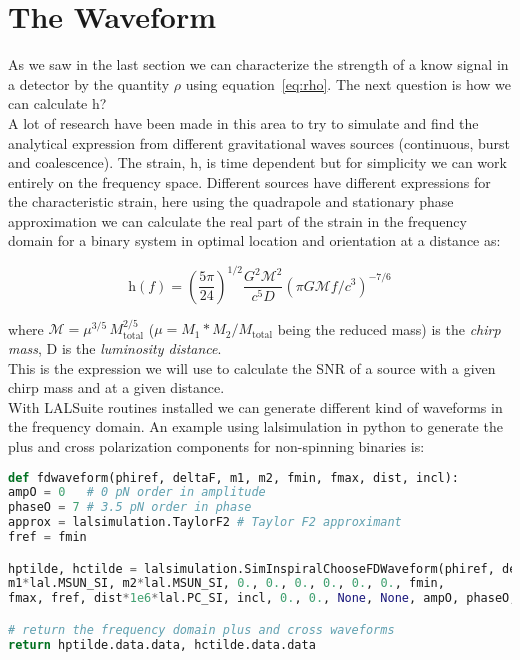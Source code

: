 \documentclass[11pt,fleqn]{book} %
\begin{document}
\section{The Waveform}\label{sec:waveform}


As we saw in the last section we can characterize the strength of a know signal in a detector by the quantity $\rho$ using equation~\ref{eq:rho}. The next question is how we can calculate h?\\

A lot of research have been made in this area to try to simulate and find the analytical expression from different gravitational waves sources (continuous, burst and coalescence). The strain, h, is time dependent but for simplicity we can work entirely on the frequency space. Different sources have different expressions for the characteristic strain, here using the quadrapole and stationary phase approximation we can calculate the real part of the strain in the frequency domain for a binary system in optimal location and orientation at a distance as:

\begin{equation}\label{eq:strain}
	\text{\~h}(f) = \left ( \frac{5 \pi}{24} \right )^{1/2}  \frac{G^2 \mathcal M ^2}{c^5 D} \left ( \pi G \mathcal M  f /c^3 \right )^{-7/6} 
\end{equation}


where $\mathcal M = \mu^{3/5} \, M_{\text{total}}^{2/5} $ ($\mu= M_1*M_2 / M_{\text{total}}$ being the reduced mass) is the \emph{chirp mass},  D is the \emph{luminosity distance}.\\

This is the expression we will use to calculate the SNR of a source with a given chirp mass and at a given distance.  \\

With LALSuite routines installed we can generate different kind of waveforms in the frequency domain. An example using lalsimulation in python to generate the plus and cross polarization components for non-spinning binaries is:

\begin{lstlisting}[language= Python,style=Python,caption={Frequency domain non-spinning inspiral waveform
}]
def fdwaveform(phiref, deltaF, m1, m2, fmin, fmax, dist, incl):
ampO = 0   # 0 pN order in amplitude
phaseO = 7 # 3.5 pN order in phase
approx = lalsimulation.TaylorF2 # Taylor F2 approximant
fref = fmin

hptilde, hctilde = lalsimulation.SimInspiralChooseFDWaveform(phiref, deltaF,
m1*lal.MSUN_SI, m2*lal.MSUN_SI, 0., 0., 0., 0., 0., 0., fmin,
fmax, fref, dist*1e6*lal.PC_SI, incl, 0., 0., None, None, ampO, phaseO, approx)

# return the frequency domain plus and cross waveforms
return hptilde.data.data, hctilde.data.data
\end{lstlisting}
\end{document}

